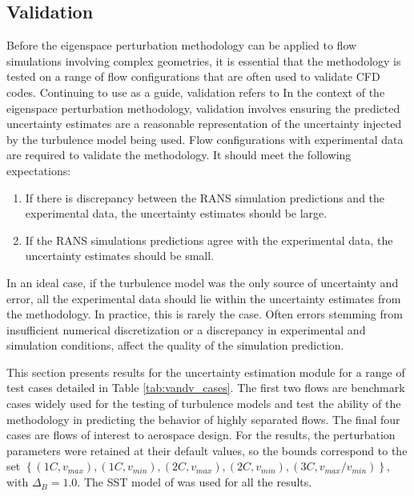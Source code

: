 \subsection{Validation} \label{sec:VandV_rans_uq}

Before the eigenspace perturbation methodology can be applied to flow simulations involving complex geometries, it is essential that the methodology is tested on a range of flow configurations that are often used to validate CFD codes. Continuing to use \cite{computational_fluid_dynamics_committee_guide_1998} as a guide, validation refers to 
 In the context of the eigenspace perturbation methodology, validation involves ensuring the predicted uncertainty estimates are a reasonable representation of the uncertainty injected by the turbulence model being used. Flow configurations with experimental data are required to validate the methodology. It should meet the following expectations:

\begin{enumerate}
    \item If there is discrepancy between the RANS simulation predictions and the experimental data, the uncertainty estimates should be large.
    \item If the RANS simulations predictions agree with the experimental data, the uncertainty estimates should be small. 
\end{enumerate}

In an ideal case, if the turbulence model was the only source of uncertainty and error, all the experimental data should lie within the uncertainty estimates from the methodology. In practice, this is rarely the case. Often errors stemming from insufficient numerical discretization or a discrepancy in experimental and simulation conditions, affect the quality of the simulation prediction. 

This section presents results for the uncertainty estimation module for a range of test cases detailed in Table \ref{tab:vandv_cases}. The first two flows are benchmark cases widely used for the testing of turbulence models and test the ability of the methodology in predicting the behavior of highly separated flows. The final four cases are flows of interest to aerospace design. For the results, the perturbation parameters were retained at their default values, so the bounds correspond to the set $ \left\{ (1C,v_{max}), (1C,v_{min}), (2C,v_{max}), (2C,v_{min}), (3C,v_{max}/v_{min}) \right\}$, with $\Delta_{B}=1.0$. The SST model of \cite{sst} was used for all the results. 

